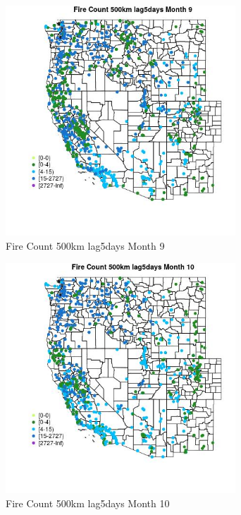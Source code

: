 \begin{figure} 
\centering  
\includegraphics[width=0.77\textwidth]{Code_Outputs/Report_ML_input_PM25_Step4_part_f_de_duplicated_aves_prioritize_24hr_obswNAs_MapObsMo9Fire_Count_500km_lag5days.jpg} 
\caption{\label{fig:Report_ML_input_PM25_Step4_part_f_de_duplicated_aves_prioritize_24hr_obswNAsMapObsMo9Fire_Count_500km_lag5days}Fire Count 500km lag5days Month 9} 
\end{figure} 
 

\begin{figure} 
\centering  
\includegraphics[width=0.77\textwidth]{Code_Outputs/Report_ML_input_PM25_Step4_part_f_de_duplicated_aves_prioritize_24hr_obswNAs_MapObsMo10Fire_Count_500km_lag5days.jpg} 
\caption{\label{fig:Report_ML_input_PM25_Step4_part_f_de_duplicated_aves_prioritize_24hr_obswNAsMapObsMo10Fire_Count_500km_lag5days}Fire Count 500km lag5days Month 10} 
\end{figure} 
 

